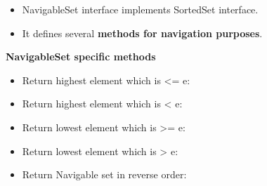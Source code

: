 \setlength{\columnsep}{3pt}
\begin{flushleft}
	
	\begin{itemize}
		\item NavigableSet interface implements SortedSet interface.
		\item It defines several \textbf{methods for navigation purposes}.	
	\end{itemize}

	\textbf{NavigableSet specific methods}
	
	\begin{itemize}
		\item Return highest element which is <= e:
		\bigskip
		\item Return highest element which is < e:
		\bigskip
		\item Return lowest element which is >= e:
		\bigskip
		\item Return lowest element which is > e:
		\bigskip
		\item Return Navigable set in reverse order:
	\end{itemize}
	
	
	
	
\end{flushleft}
\newpage


